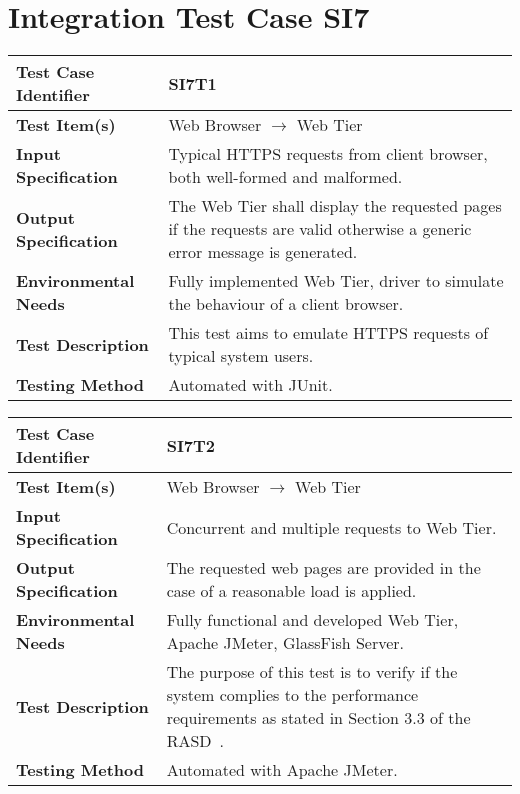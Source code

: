 \newpage
\section{Integration Test Case SI7}

\begin{longtable}{p{} | p{}}
\hline
\textbf{Test Case Identifier} & SI7T1\\
\hline
\textbf{Test Item(s)} & Web Browser $\rightarrow$ Web Tier \\
\hline
\textbf{Input Specification} & Typical HTTPS requests from client browser, both well-formed and malformed. \\
\hline
\textbf{Output Specification} & The Web Tier shall display the requested pages if the requests are valid otherwise a generic error message is generated. \\
\hline
\textbf{Environmental Needs} & Fully implemented Web Tier, driver to simulate the behaviour of a client browser. \\
\hline
\textbf{Test Description} & This test aims to emulate HTTPS requests of typical system users. \\
\hline
\textbf{Testing Method} & Automated with JUnit. \\
\hline
\end{longtable}

\begin{longtable}{p{} | p{}}
\hline
\textbf{Test Case Identifier} & SI7T2\\
\hline
\textbf{Test Item(s)} & Web Browser $\rightarrow$ Web Tier \\
\hline
\textbf{Input Specification} & Concurrent and multiple requests to Web Tier. \\
\hline
\textbf{Output Specification} & The requested web pages are provided in the case of a reasonable load is applied. \\
\hline
\textbf{Environmental Needs} & Fully functional and developed Web Tier, Apache JMeter, GlassFish Server. \\
\hline
\textbf{Test Description} & The purpose of this test is to verify if the system complies to the performance requirements as stated in Section 3.3 of the RASD~\cite{rasd}. \\
\hline
\textbf{Testing Method} & Automated with Apache JMeter. \\
\hline
\end{longtable}